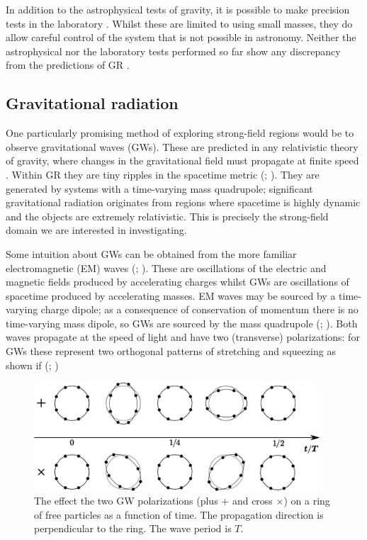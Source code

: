 In addition to the astrophysical tests of gravity, it is possible to make precision tests in the laboratory \citep{Kapner2007a,Adelberger2009}. Whilst these are limited to using small masses, they do allow careful control of the system that is not possible in astronomy. Neither the astrophysical nor the laboratory tests performed so far show any discrepancy from the predictions of GR \citep{Will2006}. 

\subsection{Gravitational radiation}

One particularly promising method of exploring strong-field regions would be to observe gravitational waves (GWs). These are predicted in any relativistic theory of gravity, where changes in the gravitational field must propagate at finite speed \citep{Schutz1984}. Within GR they are tiny ripples in the spacetime metric (\citealt[section 35.1]{Misner1973}; \citealt[section 107]{Landau1975}). They are generated by systems with a time-varying mass quadrupole; significant gravitational radiation originates from regions where spacetime is highly dynamic and the objects are extremely relativistic. This is precisely the strong-field domain we are interested in investigating.

Some intuition about GWs can be obtained from the more familiar electromagnetic (EM) waves (\citealt[sections 46--48 and 66--67]{Landau1975}; \citealt[sections 7.1 and 9.1--9.3]{Jackson1999}). These are oscillations of the electric and magnetic fields produced by accelerating charges whilst GWs are oscillations of spacetime produced by accelerating masses. EM waves may be sourced by a time-varying charge dipole; as a consequence of conservation of momentum there is no time-varying mass dipole, so GWs are sourced by the mass quadrupole (\citealt[section 18.5]{Hobson2006}; \citealt[section 15.4]{Rindler2006}). Both waves propagate at the speed of light and have two (transverse) polarizations: for GWs these represent two orthogonal patterns of stretching and squeezing as shown if  (\citealt[section 34]{Dirac1996}; \citealt[section 18.4]{Hobson2006})
\begin{figure}
  \begin{center}
  \includegraphics[width=0.95\textwidth]{./images/Polarization}
    \caption{The effect the two GW polarizations (plus $+$ and cross $\times$) on a ring of free particles as a function of time. The propagation direction is perpendicular to the ring. The wave period is $T$.}   
    \label{fig:plus-cross} 
  \end{center}
\end{figure}

